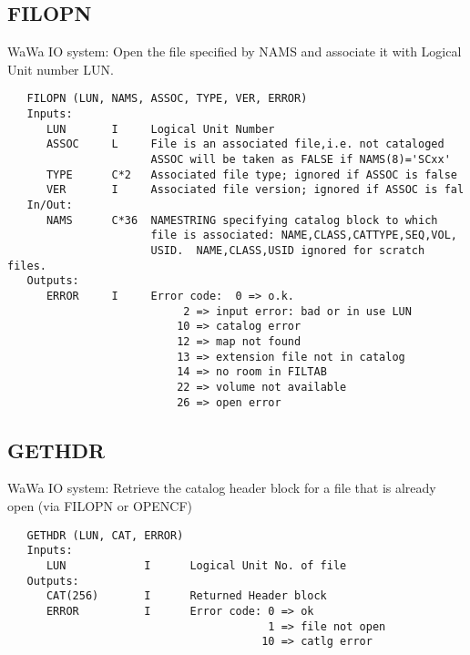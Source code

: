 \subsection{FILOPN}
WaWa IO system: Open the file specified by NAMS and associate
it with Logical Unit number LUN.
\begin{verbatim}
   FILOPN (LUN, NAMS, ASSOC, TYPE, VER, ERROR)
   Inputs:
      LUN       I     Logical Unit Number
      ASSOC     L     File is an associated file,i.e. not cataloged
                      ASSOC will be taken as FALSE if NAMS(8)='SCxx'
      TYPE      C*2   Associated file type; ignored if ASSOC is false
      VER       I     Associated file version; ignored if ASSOC is fal
   In/Out:
      NAMS      C*36  NAMESTRING specifying catalog block to which
                      file is associated: NAME,CLASS,CATTYPE,SEQ,VOL,
                      USID.  NAME,CLASS,USID ignored for scratch files.
   Outputs:
      ERROR     I     Error code:  0 => o.k.
                           2 => input error: bad or in use LUN
                          10 => catalog error
                          12 => map not found
                          13 => extension file not in catalog
                          14 => no room in FILTAB
                          22 => volume not available
                          26 => open error

\end{verbatim}

\subsection{GETHDR}
WaWa IO system: Retrieve the catalog header block for a file that
is already open (via FILOPN or OPENCF)
\begin{verbatim}
   GETHDR (LUN, CAT, ERROR)
   Inputs:
      LUN            I      Logical Unit No. of file
   Outputs:
      CAT(256)       I      Returned Header block
      ERROR          I      Error code: 0 => ok
                                        1 => file not open
                                       10 => catlg error
\end{verbatim}

